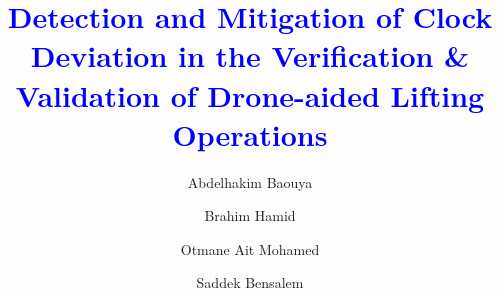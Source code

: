 \documentclass[3p,times,preprint,number,round]{elsarticle}
\theoremstyle{definition}
\newcommand{\cmt}[1] {\textcolor{blue}{#1}}
\begin{document}
\begin{frontmatter}





\title{\cmt{Detection and Mitigation of Clock Deviation in the Verification \& Validation of Drone-aided Lifting Operations}}



\author[aut2]{Abdelhakim Baouya}

\author[aut2]{Brahim Hamid}

\author[aut3]{Otmane Ait Mohamed}

\author[aut4]{Saddek Bensalem}



\address[aut2]{IRIT, Université de Toulouse, CNRS, UT2, 118 Route de Narbonne, 31062 Toulouse Cedex 9, France}

\address[aut3]{Concordia University, Montréal, Canada}



\end{frontmatter}
\end{document}

